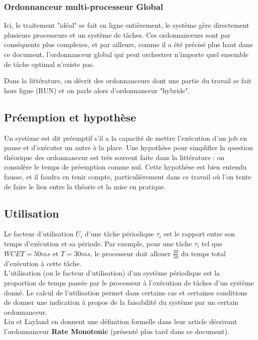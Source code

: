 \documentclass[11pt,a4paper,oneside]{report}
\begin{document}
\subsubsection{Ordonnanceur multi-processeur Global}
Ici, le traitement "idéal" se fait en ligne entièrement, le système gère directement 
plusieurs processeurs et un système de tâches. Ces ordonnanceurs sont par 
conséquents plus complexes, et par ailleurs, comme il a été précisé plus haut dans 
ce document, l'ordonnanceur global qui peut orchestrer n'importe quel ensemble de 
tâche optimal n'existe pas.

Dans la littérature, on décrit des ordonnanceurs dont une partie du travail se fait 
hors ligne (RUN) %
et on parle alors d'ordonnanceur "hybride".
	
\subsection{Préemption et hypothèse} 
Un système est dit préemptif s'il a la capacité 
	de mettre l'exécution d'un job en pause et d'exécuter un autre à la place. 
	Une hypothèse pour simplifier la question théorique des ordonnanceur est 
	très souvent faite dans la littérature : on considère le temps de 
	préemption comme nul. Cette hypothèse est bien entendu fausse, et il faudra 
	en tenir compte, particulièrement dans ce travail où l'on tente de faire 
	le lien entre la théorie et la mise en pratique. 

\subsection{Utilisation}
Le facteur d'utilisation $U_i$ d'une tâche périodique $\tau_i$ est le rapport entre 
son temps d'exécution et sa période. Par exemple, pour une tâche $\tau_i$ tel que 
$WCET = 50 ms$ et $T = 30 ms$, le processeur doit allouer $\frac{30}{50}$ du temps 
total d'exécution à cette tâche.\\

L'utilisation (ou le facteur d'utilisation) d'un système périodique est la proportion de temps 
passée par le processeur à l'exécution de tâches d'un système donné. 
Le calcul de l'utilisation permet dans certains cas et certaines conditions de donner une indication 
à propos de la faisabilité du système par un certain ordonnanceur. 
\\

Liu et Layland \cite{liulayland} en donnent une définition formelle dans leur article décrivant 
l'ordonnanceur \textbf{Rate Monotonic} (présenté plus tard dans ce document).\\ 
\end{document}
